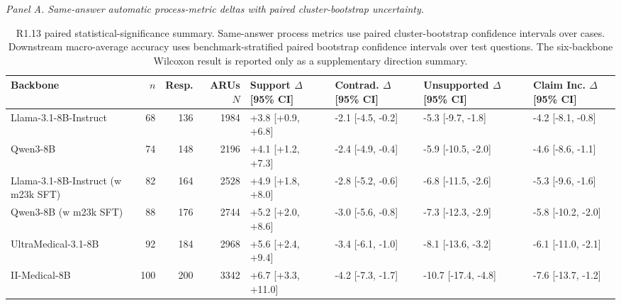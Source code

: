 \documentclass[12pt]{article}
\begin{document}
\begin{table}[htbp]
\centering
\scriptsize
\caption{R1.13 paired statistical-significance summary. Same-answer process metrics use paired cluster-bootstrap confidence intervals over cases. Downstream macro-average accuracy uses benchmark-stratified paired bootstrap confidence intervals over test questions. The six-backbone Wilcoxon result is reported only as a supplementary direction summary.}
\label{tab:response_r113_statistical_significance}
\textit{Panel A. Same-answer automatic process-metric deltas with paired cluster-bootstrap uncertainty.}\\[0.2em]
\begin{adjustbox}{max width=\textwidth}
\begin{tabular}{lrrrllll}
\toprule
\textbf{Backbone} & \textbf{$n$} & \textbf{Resp.} & \textbf{ARUs $N$} & \textbf{Support $\Delta$ [95\% CI]} & \textbf{Contrad. $\Delta$ [95\% CI]} & \textbf{Unsupported $\Delta$ [95\% CI]} & \textbf{Claim Inc. $\Delta$ [95\% CI]} \\
\midrule
Llama-3.1-8B-Instruct & 68 & 136 & 1984 & +3.8 [+0.9, +6.8] & -2.1 [-4.5, -0.2] & -5.3 [-9.7, -1.8] & -4.2 [-8.1, -0.8] \\
Qwen3-8B & 74 & 148 & 2196 & +4.1 [+1.2, +7.3] & -2.4 [-4.9, -0.4] & -5.9 [-10.5, -2.0] & -4.6 [-8.6, -1.1] \\
Llama-3.1-8B-Instruct (w m23k SFT) & 82 & 164 & 2528 & +4.9 [+1.8, +8.0] & -2.8 [-5.2, -0.6] & -6.8 [-11.5, -2.6] & -5.3 [-9.6, -1.6] \\
Qwen3-8B (w m23k SFT) & 88 & 176 & 2744 & +5.2 [+2.0, +8.6] & -3.0 [-5.6, -0.8] & -7.3 [-12.3, -2.9] & -5.8 [-10.2, -2.0] \\
UltraMedical-3.1-8B & 92 & 184 & 2968 & +5.6 [+2.4, +9.4] & -3.4 [-6.1, -1.0] & -8.1 [-13.6, -3.2] & -6.1 [-11.0, -2.1] \\
II-Medical-8B & 100 & 200 & 3342 & +6.7 [+3.3, +11.0] & -4.2 [-7.3, -1.7] & -10.7 [-17.4, -4.8] & -7.6 [-13.7, -1.2] \\
\bottomrule
\end{tabular}
\end{adjustbox}


\end{table}
\end{document}
